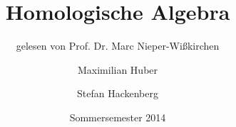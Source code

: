 \documentclass[%
halfparskip*,       %
titlepage,            %
bibtotoc,           %
DIV = 15,
headsepline,
openany,
BCOR=0.8cm,
pointlessnumbers,        %
chapterprefix=true
]
{scrbook}
\theoremstyle{plain}
\theoremstyle{plain}
\theoremstyle{plain}
\theoremstyle{nonumberplain}
\numberwithin{equation}{chapter}
\newcommand{\?}{{\huge \color{red} ?}}
\begin{document}

\frontmatter




\subject{Vorlesungszusammenfassung}
\title{Homologische Algebra}
\subtitle{gelesen von Prof. Dr. Marc Nieper-Wißkirchen}
\author{Maximilian Huber \and Stefan Hackenberg}
\date{Sommersemester 2014}  %


\maketitle             %



\cleardoubleemptypage
\tableofcontents


%
\mainmatter














\nocite{*}
\printbibliography
\end{document}
